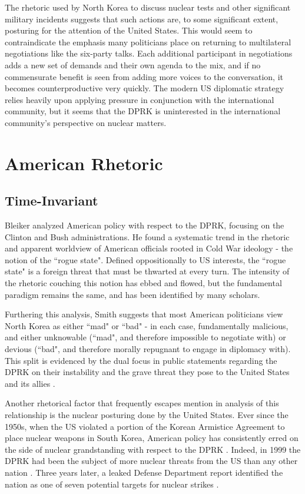 The rhetoric used by North Korea to discuss nuclear tests and other significant military incidents suggests that such actions are, to some significant extent, posturing for the attention of the United States. This would seem to contraindicate the emphasis many politicians place on returning to multilateral negotiations like the six-party talks. Each additional participant in negotiations adds a new set of demands and their own agenda to the mix, and if no commensurate benefit is seen from adding more voices to the conversation, it becomes counterproductive very quickly. The modern US diplomatic strategy relies heavily upon applying pressure in conjunction with the international community, but it seems that the DPRK is uninterested in the international community's perspective on nuclear matters.


\section{American Rhetoric}
\subsection{Time-Invariant}

Bleiker \cite{bleiker} analyzed American policy with respect to the DPRK, focusing on the Clinton and Bush administrations. He found a systematic trend in the rhetoric and apparent worldview of American officials rooted in Cold War ideology - the notion of the ``rogue state". Defined oppositionally to US interests, the ``rogue state" is a foreign threat that must be thwarted at every turn. The intensity of the rhetoric couching this notion has ebbed and flowed, but the fundamental paradigm remains the same, and has been identified by many scholars\cite{bleiker,cumings,sigal,smith}.

Furthering this analysis, Smith suggests that most American politicians view North Korea as either ``mad" or ``bad" - in each case, fundamentally malicious, and either unknowable (``mad", and therefore impossible to negotiate with) or devious (``bad", and therefore morally repugnant to engage in diplomacy with). This split is evidenced by the dual focus in public statements regarding the DPRK on their instability and the grave threat they pose to the United States and its allies \cite{smith}. 

Another rhetorical factor that frequently escapes mention in analysis of this relationship is the nuclear posturing done by the United States. Ever since the 1950s, when the US violated a portion of the Korean Armistice Agreement to place nuclear weapons in South Korea, American policy has consistently erred on the side of nuclear grandstanding with respect to the DPRK \cite{cumings}. Indeed, in 1999 the DPRK had been the subject of more nuclear threats from the US than any other nation \cite{sigal}. Three years later, a leaked Defense Department report identified the nation as one of seven potential targets for nuclear strikes \cite{harnisch}.

